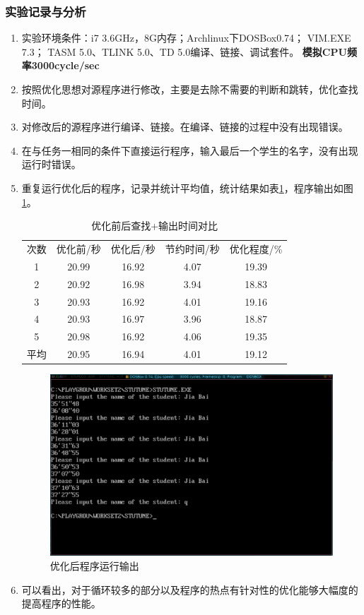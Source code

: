 \documentclass{article}
\begin{document}
	\subsubsection{实验记录与分析}
	\begin{enumerate}
		\item 实验环境条件：i7 3.6GHz，8G内存；Archlinux下DOSBox0.74； VIM.EXE 7.3； TASM 5.0、TLINK 5.0、TD 5.0编译、链接、调试套件。 {\textbf{模拟CPU频率3000cycle/sec}}
		\item 按照优化思想对源程序进行修改，主要是去除不需要的判断和跳转，优化查找时间。
		\item 对修改后的源程序进行编译、链接。在编译、链接的过程中没有出现错误。
		\item 在与任务一相同的条件下直接运行程序，输入最后一个学生的名字，没有出现运行时错误。
		\item 重复运行优化后的程序，记录并统计平均值，统计结果如表\ref{tab:table2}，程序输出如图\ref{fig:time3}。
			\begin{table}[H]
				\centering
				\caption{优化前后查找+输出时间对比}
				\label{tab:table2}
				\begin{tabular}{ c c c c c }
					\toprule
					次数 & 优化前/秒 & 优化后/秒 & 节约时间/秒 & 优化程度/\%  \\
					\cmidrule(lr){1-1}\cmidrule(lr){2-5}
					1 & 20.99 & 16.92 & 4.07 & 19.39 \\
					2 & 20.92 & 16.98 & 3.94 & 18.83 \\
					3 & 20.93 & 16.92 & 4.01 & 19.16 \\
					4 & 20.93 & 16.97 & 3.96 & 18.87 \\
					5 & 20.98 & 16.92 & 4.06 & 19.35 \\
					\cmidrule(lr){1-1}\cmidrule(lr){2-5}
					平均 & 20.95 & 16.94 & 4.01 & 19.12 \\
					\bottomrule
				\end{tabular}
			\end{table}
			\begin{figure}[H]
				\centering
				\includegraphics[width=0.9\linewidth]{res/homework_2/time3.png}
				\caption{优化后程序运行输出}
				\label{fig:time3}
			\end{figure}
		\item 可以看出，对于循环较多的部分以及程序的热点有针对性的优化能够大幅度的提高程序的性能。
	\end{enumerate}
\end{document}
